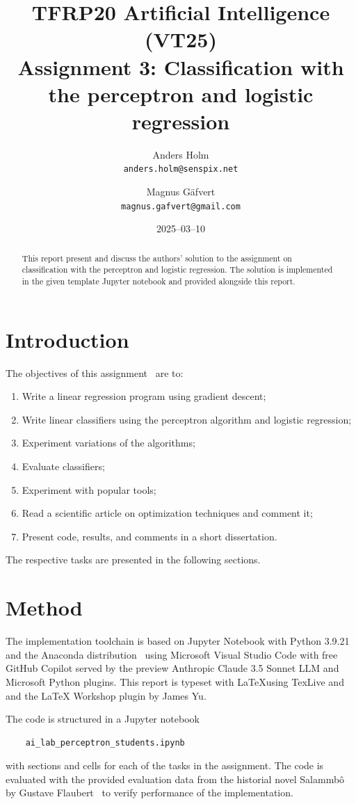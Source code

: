 \documentclass[a4paper]{article}
\title{TFRP20 Artificial Intelligence (VT25)\\ Assignment 3: Classification with the perceptron and logistic regression}
\author{Anders Holm\\\texttt{anders.holm@senspix.net} \and
Magnus Gäfvert\\\texttt{magnus.gafvert@gmail.com}}
\date{2025--03--10}
\begin{document}
\maketitle
\begin{abstract}
    This report present and discuss the authors' solution to the assignment on classification with the perceptron and logistic regression. The solution is implemented in the given template Jupyter notebook and provided alongside this report.
\end{abstract}

\section{Introduction}
The objectives of this assignment~\cite{tfrp20assignment3} are to:

\begin{enumerate}
    \item  Write a linear regression program using gradient descent;
    \item  Write linear classifiers using the perceptron algorithm and logistic regression;
    \item  Experiment variations of the algorithms;
    \item  Evaluate classifiers;
    \item  Experiment with popular tools;
    \item  Read a scientific article on optimization techniques and comment it;
    \item  Present code, results, and comments in a short dissertation. 
\end{enumerate}

The respective tasks are presented in the following sections.

\section{Method}
The implementation toolchain is based on Jupyter Notebook with Python 3.9.21 and the Anaconda distribution~\cite{anaconda} using Microsoft Visual Studio Code with free GitHub Copilot served by the preview Anthropic Claude 3.5 Sonnet LLM and Microsoft Python plugins. This report is typeset with \LaTeX using TexLive and and the LaTeX Workshop plugin by James Yu.

The code is structured in a Jupyter notebook 
\begin{verbatim}
    ai_lab_perceptron_students.ipynb    
\end{verbatim}
with sections and cells for each of the tasks in the assignment. The code is evaluated with the provided evaluation data from the historial novel Salammbô by Gustave Flaubert~\cite{flaubert1862salammbô} to verify performance of the implementation.
\end{document}
